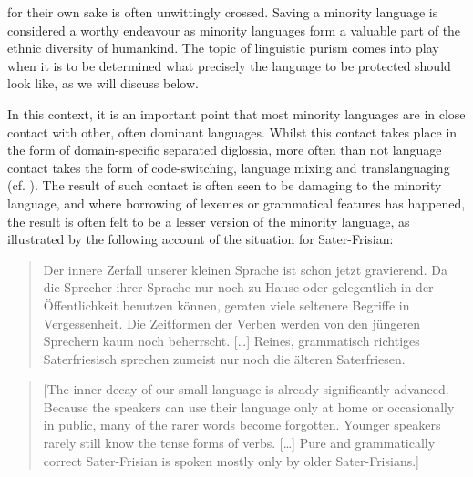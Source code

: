 \documentclass[output=paper]{langsci/langscibook}
\begin{document}
for their own sake is often unwittingly crossed. Saving a minority language is considered a worthy endeavour as minority languages form a valuable part of the ethnic diversity of humankind. The topic of linguistic purism comes into play when it is to be determined what precisely the language to be protected should look like, as we will discuss below.

In this context, it is an important point that most minority languages are in close contact with other, often dominant languages. Whilst this contact takes place in the form of domain-specific separated diglossia, more often than not language contact takes the form of code-switching, language mixing and translanguaging (cf. \citealt{GarciaWei2014}). The result of such contact is often seen to be damaging to the minority language, and where borrowing of lexemes or grammatical features has happened, the result is often felt to be a lesser version of the minority language, as illustrated by the following account of the situation for Sater-Frisian: 

\begin{quote}
Der innere Zerfall unserer kleinen Sprache ist schon jetzt gravierend. Da die Sprecher ihrer Sprache nur noch zu Hause oder gelegentlich in der Öffentlichkeit benutzen können, geraten viele seltenere Begriffe in Vergessenheit. Die Zeitformen der Verben werden von den jüngeren Sprechern kaum noch beherrscht. […] Reines, grammatisch richtiges Saterfriesisch sprechen zumeist nur noch die älteren Saterfriesen. \citep[56]{EversSchramm2009}
\end{quote}

\begin{quote}
[The inner decay of our small language is already significantly advanced. Because the speakers can use their language only at home or occasionally in public, many of the rarer words become forgotten. Younger speakers rarely still know the tense forms of verbs. […] Pure and grammatically correct Sater-Frisian is spoken mostly only by older Sater-Frisians.]
\end{quote}
\end{document}
